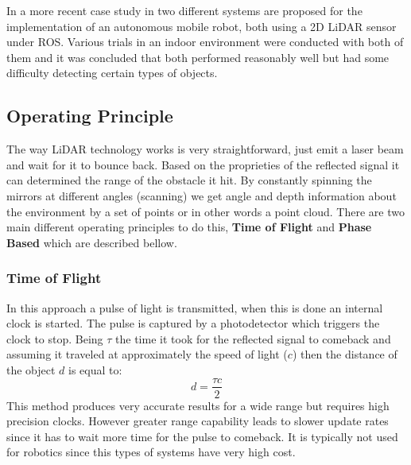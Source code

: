In a more recent case study in \cite{lidar2019ros} two different systems are proposed for the implementation of an autonomous  mobile robot, both using a 2D \ac{LiDAR} sensor under \ac{ROS}. Various trials in an indoor environment were conducted with both of them and it was concluded that both performed reasonably well but had some difficulty detecting certain types of objects.  

\subsection{Operating Principle}
The way \ac{LiDAR} technology works is very straightforward, just emit a laser beam and wait for it to bounce back. Based on the proprieties of the reflected signal it can determined the range of the obstacle it hit. By constantly spinning the mirrors at different angles (scanning) we get angle and depth information about the environment  by a  set of points or in other words a point cloud. There are two main different operating principles to do this, \textbf{Time of Flight} and \textbf{Phase Based} which are described bellow.
\subsubsection{Time of Flight}
 In this approach a pulse of light is transmitted, when this is done an internal clock is started. The pulse is captured by a photodetector which triggers the clock to stop. Being $\tau$ the time it took for the reflected signal to  comeback and assuming it traveled at approximately the speed of light ($c$) then the distance of the object $d$ is equal to:
\begin{equation}
    d=\frac{\tau c}{2}
\end{equation}
This method produces very accurate results for a wide range but requires high precision clocks. However greater  range capability leads to slower update rates since it has to wait more time for the pulse to comeback.
It is typically not used for robotics since this types of systems have very high cost.
